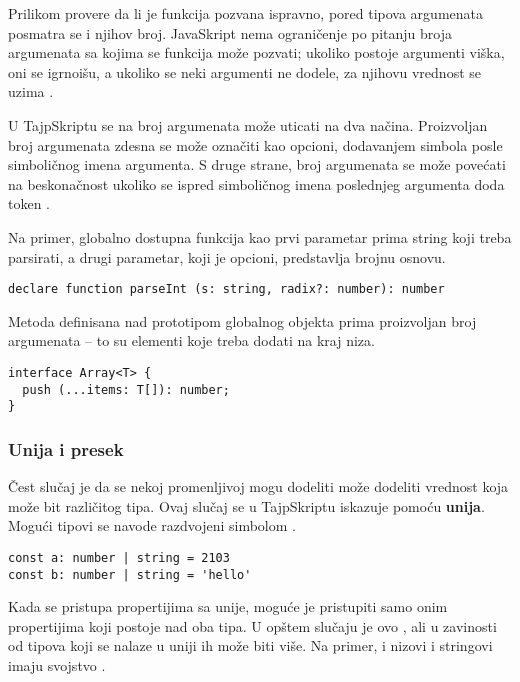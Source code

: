 Prilikom provere da li je funkcija pozvana ispravno, pored tipova argumenata posmatra se i njihov broj.
JavaSkript nema ograničenje po pitanju broja argumenata sa kojima se funkcija može pozvati; ukoliko postoje argumenti viška, oni se igrnoišu, a ukoliko se neki argumenti ne dodele, za njihovu vrednost se uzima .

U TajpSkriptu se na broj argumenata može uticati na dva načina.
Proizvoljan broj argumenata zdesna se može označiti kao opcioni, dodavanjem simbola  posle simboličnog imena argumenta.
S druge strane, broj argumenata se može povećati na beskonačnost ukoliko se ispred simboličnog imena poslednjeg argumenta doda token .

Na primer, globalno dostupna funkcija  kao prvi parametar prima string koji treba parsirati, a drugi parametar, koji je opcioni, predstavlja brojnu osnovu.

\begin{verbatim}
declare function parseInt (s: string, radix?: number): number
\end{verbatim}

Metoda  definisana nad prototipom globalnog objekta  prima proizvoljan broj argumenata -- to su elementi koje treba dodati na kraj niza.

\begin{verbatim}
interface Array<T> {
  push (...items: T[]): number;
}
\end{verbatim}

\subsubsection{Unija i presek}

Čest slučaj je da se nekoj promenljivoj mogu dodeliti može dodeliti vrednost koja može bit različitog tipa.
Ovaj slučaj se u TajpSkriptu iskazuje pomoću \textbf{unija}.
Mogući tipovi se navode razdvojeni simbolom \code{|}.

\begin{verbatim}
const a: number | string = 2103
const b: number | string = 'hello'
\end{verbatim}

Kada se pristupa propertijima sa unije, moguće je pristupiti samo onim propertijima koji postoje nad oba tipa.
U opštem slučaju je ovo , ali u zavinosti od tipova koji se nalaze u uniji ih može biti više.
Na primer, i nizovi i stringovi imaju svojstvo .

